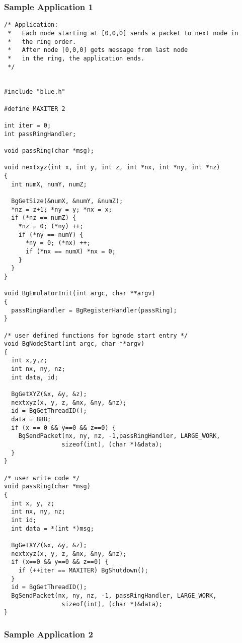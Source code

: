 \subsubsection{Sample Application 1}

\begin{verbatim}
/* Application: 
 *   Each node starting at [0,0,0] sends a packet to next node in
 *   the ring order.
 *   After node [0,0,0] gets message from last node
 *   in the ring, the application ends.
 */


#include "blue.h"

#define MAXITER 2

int iter = 0;
int passRingHandler;

void passRing(char *msg);

void nextxyz(int x, int y, int z, int *nx, int *ny, int *nz)
{
  int numX, numY, numZ;

  BgGetSize(&numX, &numY, &numZ);
  *nz = z+1; *ny = y; *nx = x;
  if (*nz == numZ) {
    *nz = 0; (*ny) ++;
    if (*ny == numY) {
      *ny = 0; (*nx) ++;
      if (*nx == numX) *nx = 0;
    }
  }
}

void BgEmulatorInit(int argc, char **argv)
{
  passRingHandler = BgRegisterHandler(passRing);
}

/* user defined functions for bgnode start entry */
void BgNodeStart(int argc, char **argv)
{
  int x,y,z;
  int nx, ny, nz;
  int data, id;

  BgGetXYZ(&x, &y, &z);
  nextxyz(x, y, z, &nx, &ny, &nz);
  id = BgGetThreadID();
  data = 888;
  if (x == 0 && y==0 && z==0) {
    BgSendPacket(nx, ny, nz, -1,passRingHandler, LARGE_WORK, 
				sizeof(int), (char *)&data);
  }
}

/* user write code */
void passRing(char *msg)
{
  int x, y, z;
  int nx, ny, nz;
  int id;
  int data = *(int *)msg;

  BgGetXYZ(&x, &y, &z);
  nextxyz(x, y, z, &nx, &ny, &nz);
  if (x==0 && y==0 && z==0) {
    if (++iter == MAXITER) BgShutdown();
  }
  id = BgGetThreadID();
  BgSendPacket(nx, ny, nz, -1, passRingHandler, LARGE_WORK, 
				sizeof(int), (char *)&data);
}

\end{verbatim}


\subsubsection{Sample Application 2}


